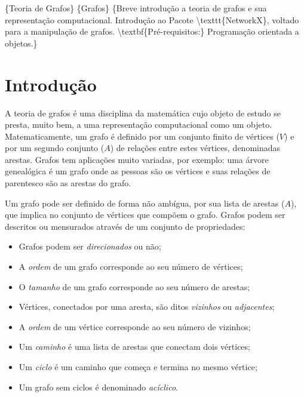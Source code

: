 \documentclass[a4paper,10pt,portuguese]{sphinxmanual}
\begin{document}
\{Teoria de Grafos\} \{Grafos\}
\{Breve introdução a teoria de grafos e sua representação computacional. Introdução ao Pacote \textbackslash{}texttt\{NetworkX\}, voltado para a manipulação de grafos.
\textbackslash{}textbf\{Pré-requisitos:\} Programação orientada a objetos.\}


\chapter{Introdução}
\label{capgraph:introducao}\label{capgraph::doc}
A teoria de grafos é uma disciplina da matemática cujo objeto de
estudo se presta, muito bem, a uma representação computacional como
um objeto. Matematicamente, um grafo é definido por um conjunto
finito de vértices ($V$) e por um segundo conjunto
($A$) de relações entre estes vértices, denominadas
arestas. Grafos tem aplicações muito variadas, por exemplo: uma
árvore genealógica é um grafo onde as pessoas são os vértices e
suas relações de parentesco são as arestas do grafo.

Um grafo pode ser definido de forma não ambígua, por sua lista de
arestas ($A$), que implica no conjunto de vértices que
compõem o grafo. Grafos podem ser descritos ou mensurados através
de um conjunto de propriedades:
\begin{itemize}
\item {} 
Grafos podem ser \emph{direcionados} ou não;

\item {} 
A \emph{ordem} de um grafo corresponde ao seu número de vértices;

\item {} 
O \emph{tamanho} de um grafo corresponde ao seu número de arestas;

\item {} 
Vértices, conectados por uma aresta, são ditos \emph{vizinhos} ou
\emph{adjacentes};

\item {} 
A \emph{ordem} de um vértice corresponde ao seu número de vizinhos;

\item {} 
Um \emph{caminho} é uma lista de arestas que conectam dois vértices;

\item {} 
Um \emph{ciclo} é um caminho que começa e termina no mesmo vértice;

\item {} 
Um grafo sem ciclos é denominado \emph{acíclico}.

\end{itemize}
\end{document}
